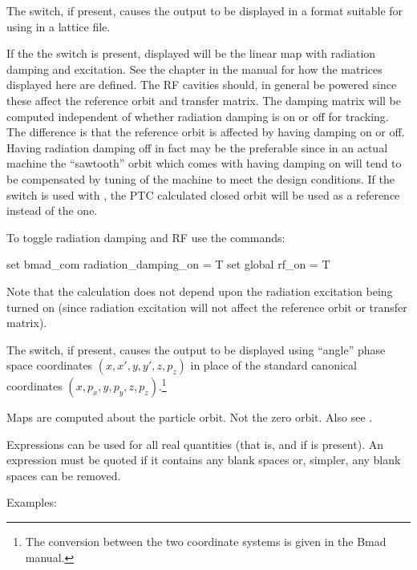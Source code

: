 {{{{{{{{{{The  switch, if present, causes the output to be displayed in a format suitable
for using in a \bmad lattice file.

If the the  switch is present, displayed will be the linear map with radiation
damping and excitation. See the  chapter in the \bmad manual for how the
matrices displayed here are defined. The RF cavities should, in general be powered since these
affect the reference orbit and transfer matrix. The damping matrix will be computed independent of
whether radiation damping is on or off for tracking. The difference is that the reference orbit is
affected by having damping on or off. Having radiation damping off in fact may be the preferable
since in an actual machine the ``sawtooth'' orbit which comes with having damping on will tend to be
compensated by tuning of the machine to meet the design conditions. If the  switch is used
with , the PTC calculated closed orbit will be used as a reference instead of the
\bmad one.

To toggle radiation damping and RF use the commands:
\begin{example}
  set bmad_com radiation_damping_on = T
  set global rf_on = T
\end{example}
Note that the calculation does not depend upon the radiation excitation being turned on (since
radiation excitation will not affect the reference orbit or transfer matrix).

The  switch, if present, causes the output to be displayed using ``angle''
phase space coordinates $(x, x', y, y', z, p_z)$ in place of the standard \bmad canonical
coordinates $(x, p_x, y, p_y, z, p_z)$.\footnote
  {
The conversion between the two coordinate systems is given in the Bmad manual.
  }

Maps are computed about the particle orbit. Not the zero orbit. Also see .

Expressions can be used for all real quantities (that is,  and  if  is
present). An expression must be quoted if it contains any blank spaces or, simpler, any blank spaces
can be removed.

Examples:

}}}}}}}}}}
